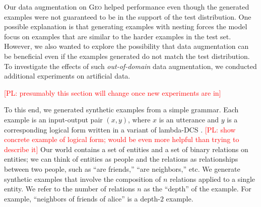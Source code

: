 \documentclass[11pt,letterpaper]{article}
\newcommand{\geo}{\textsc{Geo}\xspace}
\newcommand\pl[1]{\textcolor{red}{[PL: #1]}}
\begin{document}
Our data augmentation on \geo helped performance
even though the generated examples were not guaranteed
to be in the support of the test distribution.
One possible explanation is that generating examples with nesting
forces the model focus on examples that are similar to the harder examples
in the test set.
However, we also wanted to explore the possibility that
data augmentation can be beneficial even if the examples generated
do not match the test distribution.
To investigate the effects of such \emph{out-of-domain} data augmentation,
we conducted additional experiments on artificial data.

\pl{presumably this section will change once new experiments are in}

To this end, we generated synthetic examples from a simple grammar.
Each example is an input-output pair $(x, y)$, where
$x$ is an utterance and $y$ is a corresponding
logical form written in a variant of lambda-DCS \cite{liang2013lambdadcs}.
\pl{show concrete example of logical form; would be even more helpful than trying to describe it}
Our world contains a set of entities and a set of binary relations
on entities; we can think of entities as people
and the relations as relationships between two people, such as ``are friends,''
``are neighbors,'' etc.
We generate synthetic examples that involve the 
composition of $n$ relations applied to a single entity.  
We refer to the number of relations $n$ as the ``depth'' of the example.
For example, ``neighbors of friends of alice''
is a depth-$2$ example.
\end{document}
